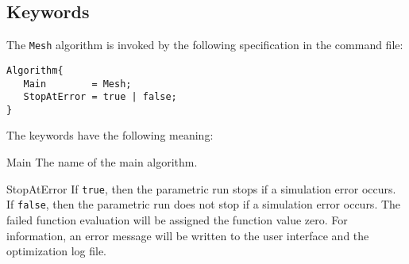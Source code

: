 \subsection{Keywords}

The \texttt{Mesh} algorithm is invoked by the following specification in the command file:
\begin{lstlisting}
Algorithm{
   Main        = Mesh;
   StopAtError = true | false;
}
\end{lstlisting}

\noindent The keywords have the following meaning:
\begin{codedescription}
\item[Main]
The name of the main algorithm.
\item[StopAtError]
If \texttt{true}, then the parametric run stops if a simulation error occurs. 
If \texttt{false}, then the parametric run does not stop if a simulation error occurs.
The failed function evaluation will be assigned the function value zero.
For information, an error message will be written to the user interface
and the optimization log file.
\end{codedescription}

\label{sec:algImpEnd}
